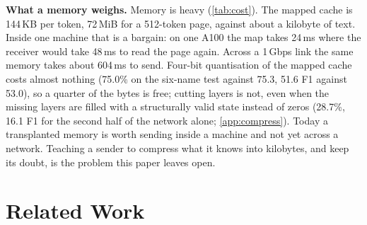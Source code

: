 \documentclass{article}
\begin{document}
\textbf{What a memory weighs.} Memory is heavy (\cref{tab:cost}). The mapped cache is 144\,KB per token, 72\,MiB for a 512-token page, against about a kilobyte of text. Inside one machine that is a bargain: on one A100 the map takes 24\,ms where the receiver would take 48\,ms to read the page again. Across a 1\,Gbps link the same memory takes about 604\,ms to send. Four-bit quantisation of the mapped cache costs almost nothing (75.0\% on the six-name test against 75.3, 51.6 F1 against 53.0), so a quarter of the bytes is free; cutting layers is not, even when the missing layers are filled with a structurally valid state instead of zeros (28.7\%, 16.1 F1 for the second half of the network alone; \cref{app:compress}). Today a transplanted memory is worth sending inside a machine and not yet across a network. Teaching a sender to compress what it knows into kilobytes, and keep its doubt, is the problem this paper leaves open.


\begin{table}[t]
\caption{What the message costs. Bytes per prefix token of the mapped cache (512-token SQuAD passages; ``KB'' $= 1024$ bytes). Noma: 6-name variant, $n = 300$, seed-2 projector. ``filler'' fills the untransmitted layers or heads with the receiver's own cache of a neutral text of the same length. The full sweep, including zero and mean-vector fills and smaller projectors, is in \cref{app:compress}.}
\label{tab:cost}
\vskip 0.1in
\begin{center}
\begin{footnotesize}
\end{footnotesize}
\end{center}
\vskip -0.1in
\end{table}
\section{Related Work}
\label{sec:related}
\end{document}
